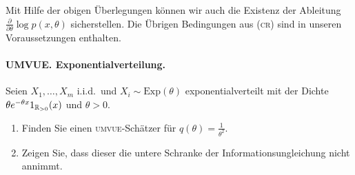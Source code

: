 Mit Hilfe der obigen Überlegungen können wir auch die Existenz der Ableitung 
$\frac{\partial}{\partial \theta} \log p(x,\theta)$ sicherstellen.
Die Übrigen Bedingungen aus (\textsc{cr}) sind in unseren Voraussetzungen enthalten.






\paragraph{UMVUE. Exponentialverteilung.}
Seien $X_1,\ldots,X_m$ i.i.d.\ und $X_i\sim \textrm{Exp}(\theta)$
exponentialverteilt mit der Dichte $\theta e^{-\theta x}1_{\mathbb R_{>0}}(x)$ und
$\theta>0$.
\begin{enumerate}
    \item Finden Sie einen \textsc{umvue}-Schätzer für $q(\theta) =
        \frac{1}{\theta^2}$.
    \item Zeigen Sie, dass dieser die untere Schranke der Informationsungleichung
        nicht annimmt.
\end{enumerate}
 
